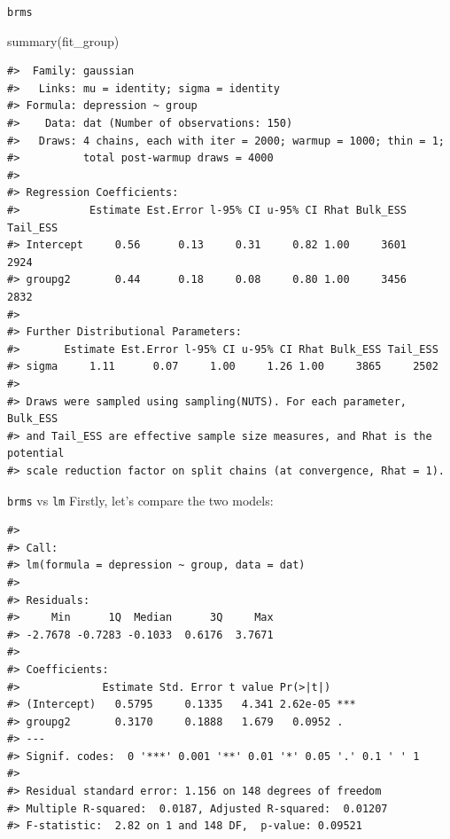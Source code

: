 \documentclass[
  ignorenonframetext,
]{beamer}
\newenvironment{Shaded}{\begin{snugshade}}{\end{snugshade}}
\newcommand{\FunctionTok}[1]{\textcolor[rgb]{0.28,0.35,0.67}{#1}}
\newcommand{\NormalTok}[1]{\textcolor[rgb]{0.00,0.23,0.31}{#1}}
\begin{document}
\begin{frame}[fragile]{\texttt{brms}}
\label{brms-2}
\begin{Shaded}
\begin{Highlighting}[]
\FunctionTok{summary}\NormalTok{(fit\_group)}
\end{Highlighting}
\end{Shaded}

\begin{verbatim}
#>  Family: gaussian 
#>   Links: mu = identity; sigma = identity 
#> Formula: depression ~ group 
#>    Data: dat (Number of observations: 150) 
#>   Draws: 4 chains, each with iter = 2000; warmup = 1000; thin = 1;
#>          total post-warmup draws = 4000
#> 
#> Regression Coefficients:
#>           Estimate Est.Error l-95% CI u-95% CI Rhat Bulk_ESS Tail_ESS
#> Intercept     0.56      0.13     0.31     0.82 1.00     3601     2924
#> groupg2       0.44      0.18     0.08     0.80 1.00     3456     2832
#> 
#> Further Distributional Parameters:
#>       Estimate Est.Error l-95% CI u-95% CI Rhat Bulk_ESS Tail_ESS
#> sigma     1.11      0.07     1.00     1.26 1.00     3865     2502
#> 
#> Draws were sampled using sampling(NUTS). For each parameter, Bulk_ESS
#> and Tail_ESS are effective sample size measures, and Rhat is the potential
#> scale reduction factor on split chains (at convergence, Rhat = 1).
\end{verbatim}
\end{frame}

\begin{frame}[fragile]{\texttt{brms} vs \texttt{lm}}
\label{brms-vs-lm}
Firstly, let's compare the two models:

\begin{verbatim}
#> 
#> Call:
#> lm(formula = depression ~ group, data = dat)
#> 
#> Residuals:
#>     Min      1Q  Median      3Q     Max 
#> -2.7678 -0.7283 -0.1033  0.6176  3.7671 
#> 
#> Coefficients:
#>             Estimate Std. Error t value Pr(>|t|)    
#> (Intercept)   0.5795     0.1335   4.341 2.62e-05 ***
#> groupg2       0.3170     0.1888   1.679   0.0952 .  
#> ---
#> Signif. codes:  0 '***' 0.001 '**' 0.01 '*' 0.05 '.' 0.1 ' ' 1
#> 
#> Residual standard error: 1.156 on 148 degrees of freedom
#> Multiple R-squared:  0.0187, Adjusted R-squared:  0.01207 
#> F-statistic:  2.82 on 1 and 148 DF,  p-value: 0.09521
\end{verbatim}
\end{frame}
\end{document}
